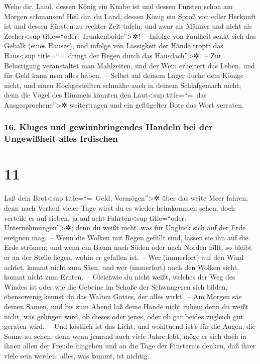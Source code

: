 Wehe dir, Land, dessen König ein Knabe ist und dessen
Fürsten schon am Morgen schmausen! Heil dir, du Land,
dessen König ein Sproß von edler Herkunft ist und dessen Fürsten zu
rechter Zeit tafeln, und zwar als Männer und nicht als
Zecher\textless sup title=``oder: Trunkenbolde''\textgreater✲!~--
Infolge von Faulheit senkt sich das Gebälk (eines
Hauses), und infolge von Lässigkeit der Hände tropft das
Haus\textless sup title=``=~dringt der Regen durch das
Hausdach''\textgreater✲.~-- Zur Belustigung veranstaltet
man Mahlzeiten, und der Wein erheitert das Leben, und für Geld kann man
alles haben.~-- Selbst auf deinem Lager fluche dem Könige
nicht, und einen Hochgestellten schmähe auch in deinem Schlafgemach
nicht; denn die Vögel des Himmels könnten den Laut\textless sup
title=``=~das Ausgesprochene''\textgreater✲ weitertragen und ein
geflügelter Bote das Wort verraten.

\hypertarget{kluges-und-gewinnbringendes-handeln-bei-der-ungewiuxdfheit-alles-irdischen}{%
\subsubsection{16. Kluges und gewinnbringendes Handeln bei der
Ungewißheit alles
Irdischen}\label{kluges-und-gewinnbringendes-handeln-bei-der-ungewiuxdfheit-alles-irdischen}}

\hypertarget{section-10}{%
\section{11}\label{section-10}}

Laß dein Brot\textless sup title=``=~Geld,
Vermögen''\textgreater✲ über das weite Meer fahren; denn nach Verlauf
vieler Tage wirst du es wieder heimkommen sehen; doch
verteile es auf sieben, ja auf acht Fahrten\textless sup title=``oder:
Unternehmungen''\textgreater✲; denn du weißt nicht, was für Unglück sich
auf der Erde ereignen mag.~-- Wenn die Wolken mit Regen
gefüllt sind, lassen sie ihn auf die Erde strömen; und wenn ein Baum
nach Süden oder nach Norden fällt, so bleibt er an der Stelle liegen,
wohin er gefallen ist.~-- Wer (immerfort) auf den Wind
achtet, kommt nicht zum Säen, und wer (immerfort) nach den Wolken sieht,
kommt nicht zum Ernten.~-- Gleichwie du nicht weißt,
welches der Weg des Windes ist oder wie die Gebeine im Schoße der
Schwangeren sich bilden, ebensowenig kennst du das Walten Gottes, der
alles wirkt.~-- Am Morgen säe deinen Samen, und bis zum
Abend laß deine Hände nicht ruhen; denn du weißt nicht, was gelingen
wird, ob dieses oder jenes, oder ob gar beides zugleich gut geraten
wird.~-- Und köstlich ist das Licht, und wohltuend ist's
für die Augen, die Sonne zu sehen; denn wenn jemand auch
viele Jahre lebt, möge er sich doch in ihnen allen der Freude hingeben
und an die Tage der Finsternis denken, daß ihrer viele sein werden:
alles, was kommt, ist nichtig.

